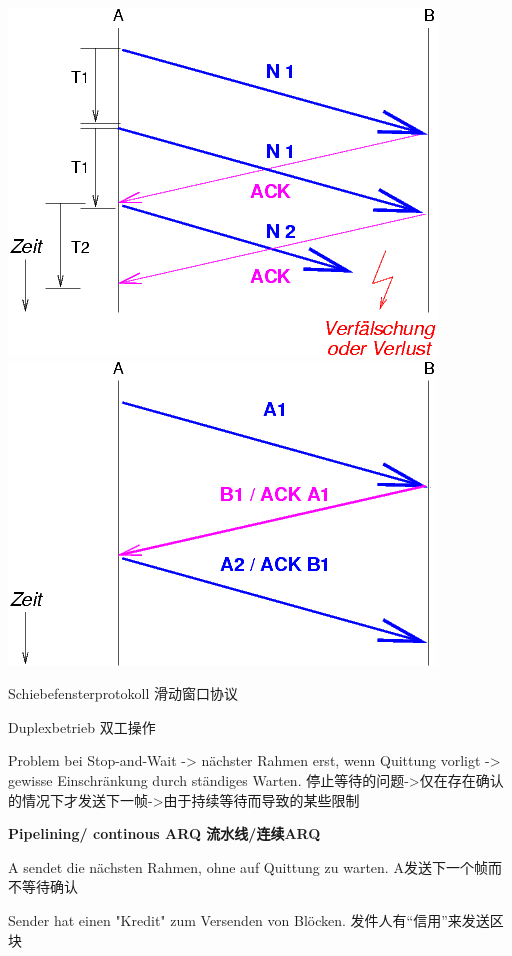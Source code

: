 \documentclass[fleqn]{article}
\begin{document}
\begin{center}
    \includegraphics[scale=0.5]{bild26.png}
    \includegraphics[scale=0.5]{bild27.png}
\end{center}


 Schiebefensterprotokoll 滑动窗口协议

Duplexbetrieb 双工操作 

Problem bei Stop-and-Wait -> nächster Rahmen erst, wenn Quittung vorligt -> gewisse Einschränkung durch ständiges Warten. 停止等待的问题->仅在存在确认的情况下才发送下一帧->由于持续等待而导致的某些限制

\noindent\textbf{Pipelining/ continous ARQ 流水线/连续ARQ}

A sendet die nächsten Rahmen, ohne auf Quittung zu warten. A发送下一个帧而不等待确认 

Sender hat einen "Kredit" zum Versenden von Blöcken. 发件人有“信用”来发送区块  
\end{document}
